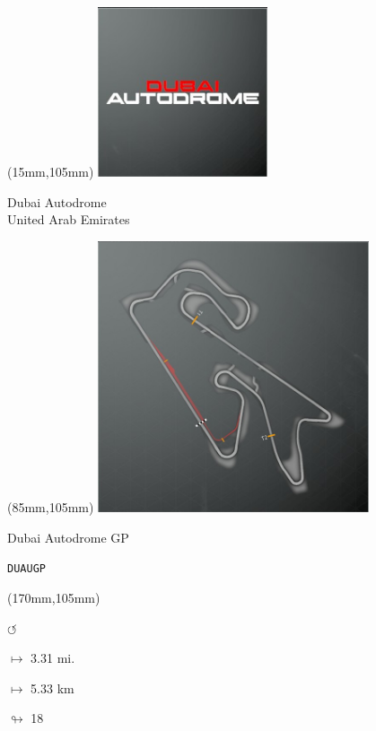 \begin{textblock*}{60mm}(15mm,105mm)%
\includegraphics[width=50mm]{LG/2015-05-20_00081.png}
\par Dubai Autodrome\\ United Arab Emirates
\end{textblock*}
\begin{textblock*}{80mm}(85mm,105mm)%
\includegraphics[width=80mm]{TR/2015-05-20_00024.png}
\centerline{Dubai Autodrome GP}
\par\hfill\tiny\tt DUAUGP\\
\end{textblock*}
\begin{textblock*}{30mm}(170mm,105mm)%
\par \Huge$\circlearrowleft$
\Large
\par$\mapsto$ 3.31 mi.
\par$\mapsto$ 5.33 km
\par$\looparrowright$ 18
\end{textblock*}

